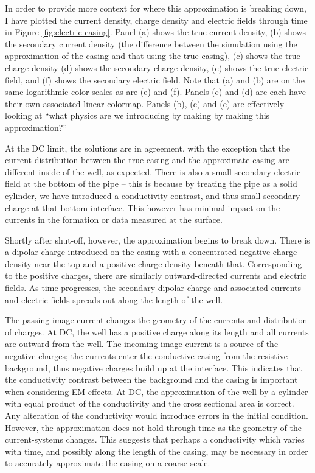 

In order to provide more context for where this approximation is breaking down, I have plotted the current density, charge density and electric fields through time in Figure \ref{fig:electric-casing}. Panel (a) shows the true current density, (b) shows the secondary current density (the difference between the simulation using the approximation of the casing and that using the true casing), (c) shows the true charge density (d) shows the secondary charge density, (e) shows the true electric field, and (f) shows the secondary electric field. Note that (a) and (b) are on the same logarithmic color scales as are (e) and (f). Panels (c) and (d) are each have their own associated linear colormap. Panels (b), (c) and (e) are effectively looking at ``what physics are we introducing by making by making this approximation?''



At the DC limit, the solutions are in agreement, with the exception that the current distribution between the true casing and the approximate casing are different inside of the well, as expected. There is also a small secondary electric field at the bottom of the pipe -- this is because by treating the pipe as a solid cylinder, we have introduced a conductivity contrast, and thus small secondary charge at that bottom interface. This however has minimal impact on the currents in the formation or data measured at the surface.

Shortly after shut-off, however, the approximation begins to break down. There is a dipolar charge introduced on the casing with a concentrated negative charge density near the top and a positive charge density beneath that. Corresponding to the positive charges, there are similarly outward-directed currents and electric fields. As time progresses, the secondary dipolar charge and associated currents and electric fields spreads out along the length of the well.

The passing image current changes the geometry of the currents and distribution of charges. At DC, the well has a positive charge along its length and all currents are outward from the well. The incoming image current is a source of the negative charges; the currents enter the conductive casing from the resistive background, thus negative charges build up at the interface. This indicates that the conductivity contrast between the background and the casing is important when considering EM effects. At DC, the approximation of the well by a cylinder with equal product of the conductivity and the cross sectional area is correct. Any alteration of the conductivity would introduce errors in the initial condition. However, the approximation does not hold through time as the geometry of the current-systems changes. This suggests that perhaps a conductivity which varies with time, and possibly along the length of the casing, may be necessary in order to accurately approximate the casing on a coarse scale.


